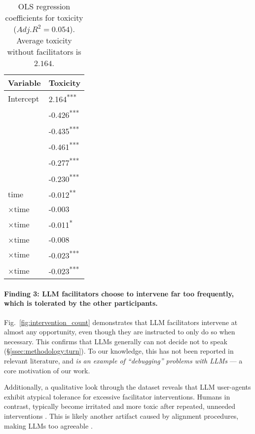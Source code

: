 \begin{table}[t]
	\centering
	\begin{tabular}{p{5cm} p{1.5cm}}
		\toprule
		\textbf{Variable} & \textbf{Toxicity} \\
		\midrule
		Intercept & 2.164\textsuperscript{***} \\
		\strategynoinstr & -0.426\textsuperscript{***} \\
		\strategymodgame & -0.435\textsuperscript{***} \\
		\strategyrules & -0.461\textsuperscript{***} \\
		\strategyregroom & -0.277\textsuperscript{***} \\
		\strategyconstrcomm & -0.230\textsuperscript{***} \\
		time & -0.012\textsuperscript{**} \\
		\strategynoinstr$\times$time & -0.003 \\
		\strategymodgame$\times$time & -0.011\textsuperscript{*} \\
		\strategyrules$\times$time & -0.008 \\
		\strategyregroom$\times$time & -0.023\textsuperscript{***} \\
		\strategyconstrcomm$\times$time & -0.023\textsuperscript{***} \\
		\bottomrule
	\end{tabular}
	\small
	\asterisknote
	\normalsize
	\caption{OLS regression coefficients for toxicity ($Adj. R^2=0.054$). Average toxicity without facilitators is $2.164$.}
	\label{tab:toxicity}
\end{table}


\paragraph{Finding 3: LLM facilitators choose to intervene far too frequently, which is tolerated by the other participants.} Fig.~\ref{fig:intervention_count} demonstrates that LLM facilitators intervene at almost any opportunity, even though they are instructed to only do so when necessary. This confirms that LLMs generally can not decide not to speak (\S\ref{ssec:methodology:turn}). To our knowledge, this has not been reported in relevant literature, and \emph{is an example of ``debugging'' problems with LLMs} --- a core motivation of our work.

Additionally, a qualitative look through the dataset reveals that LLM user-agents exhibit atypical tolerance for excessive facilitator interventions. Humans in contrast, typically become irritated and more toxic after repeated, unneeded interventions \citep{schaffner_community_guidelines, make_reddit_great, proactive_moderation, cresci_pesonalized_interventions}. This is likely another artifact caused by alignment procedures, making LLMs too agreeable \citep{park2023game}.

